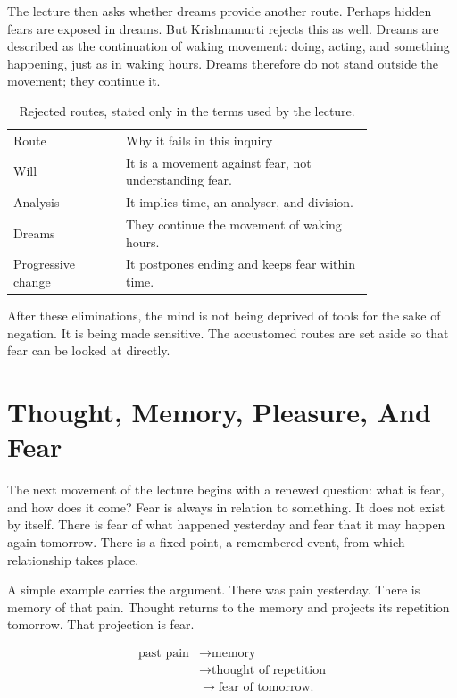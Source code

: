 The lecture then asks whether dreams provide another route. Perhaps hidden fears are exposed in dreams. But Krishnamurti rejects this as well. Dreams are described as the continuation of waking movement: doing, acting, and something happening, just as in waking hours. Dreams therefore do not stand outside the movement; they continue it.

\begin{table}
\centering
\begin{tabular}{p{0.25\linewidth} p{0.55\linewidth}}
Route & Why it fails in this inquiry \\
Will & It is a movement against fear, not understanding fear. \\
Analysis & It implies time, an analyser, and division. \\
Dreams & They continue the movement of waking hours. \\
Progressive change & It postpones ending and keeps fear within time. \\
\end{tabular}
\caption{Rejected routes, stated only in the terms used by the lecture.}
\end{table}

After these eliminations, the mind is not being deprived of tools for the sake of negation. It is being made sensitive. The accustomed routes are set aside so that fear can be looked at directly.

\section{Thought, Memory, Pleasure, And Fear}

The next movement of the lecture begins with a renewed question: what is fear, and how does it come? Fear is always in relation to something. It does not exist by itself. There is fear of what happened yesterday and fear that it may happen again tomorrow. There is a fixed point, a remembered event, from which relationship takes place.

A simple example carries the argument. There was pain yesterday. There is memory of that pain. Thought returns to the memory and projects its repetition tomorrow. That projection is fear.

\begin{align}
\text{past pain}
&\longrightarrow \text{memory} \\
&\longrightarrow \text{thought of repetition} \\
&\longrightarrow \text{fear of tomorrow}.
\end{align}


